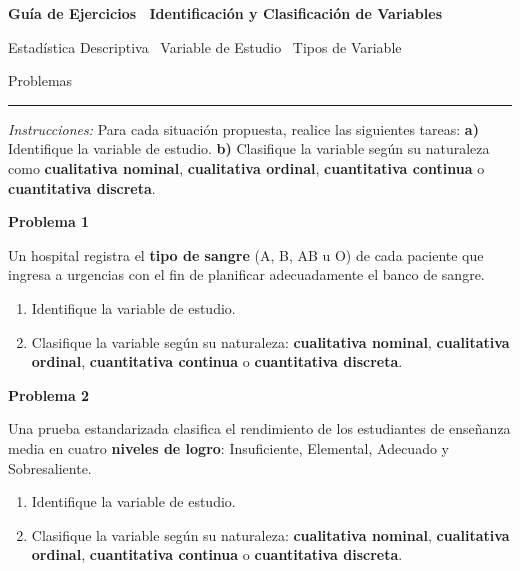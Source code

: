 \documentclass[10pt,letterpaper]{article}
\newcommand{\problema}[1]{%
  \vspace{2pt}%
  \begin{tcolorbox}[
    enhanced,
    colback=white,
    colframe=black,
    arc=0pt,
    boxrule=0pt,
    leftrule=2pt,
    left=6pt, right=6pt,
    top=1pt, bottom=1pt,
  ]
    {\normalsize\bfseries\sffamily #1}
  \end{tcolorbox}%
  \vspace{1pt}%
}
\begin{document}
\thispagestyle{empty}

\begin{center}
  {\fontsize{15}{17}\selectfont\bfseries\sffamily Gu\'ia de Ejercicios \textendash\ Identificaci\'on y Clasificaci\'on de Variables\par}
  \vspace{0.05cm}
  {\small\sffamily Estad\'istica Descriptiva \textperiodcentered\ Variable de Estudio \textperiodcentered\ Tipos de Variable\par}
  {\footnotesize{} Problemas\par}
  {\rule{3cm}{0.6pt}}
\end{center}

\vspace{0.1cm}

\noindent\sffamily\small\textit{Instrucciones:} Para cada situaci\'on propuesta, realice las siguientes tareas: \textbf{a)} Identifique la variable de estudio. \textbf{b)} Clasifique la variable seg\'un su naturaleza como \textbf{cualitativa nominal}, \textbf{cualitativa ordinal}, \textbf{cuantitativa continua} o \textbf{cuantitativa discreta}.

\vspace{4pt}

\problema{Problema 1}
\noindent\sffamily\small Un hospital registra el \textbf{tipo de sangre} (A, B, AB u O) de cada paciente que ingresa a urgencias con el fin de planificar adecuadamente el banco de sangre.
\begin{enumerate}[leftmargin=1.2cm, label=\textbf{\alph*)}, itemsep=0pt, topsep=2pt]
  \item Identifique la variable de estudio.
  \item Clasifique la variable seg\'un su naturaleza: \textbf{cualitativa nominal}, \textbf{cualitativa ordinal}, \textbf{cuantitativa continua} o \textbf{cuantitativa discreta}.
\end{enumerate}

\problema{Problema 2}
\noindent\sffamily\small Una prueba estandarizada clasifica el rendimiento de los estudiantes de ense\~nanza media en cuatro \textbf{niveles de logro}: Insuficiente, Elemental, Adecuado y Sobresaliente.
\begin{enumerate}[leftmargin=1.2cm, label=\textbf{\alph*)}, itemsep=0pt, topsep=2pt]
  \item Identifique la variable de estudio.
  \item Clasifique la variable seg\'un su naturaleza: \textbf{cualitativa nominal}, \textbf{cualitativa ordinal}, \textbf{cuantitativa continua} o \textbf{cuantitativa discreta}.
\end{enumerate}
\end{document}
